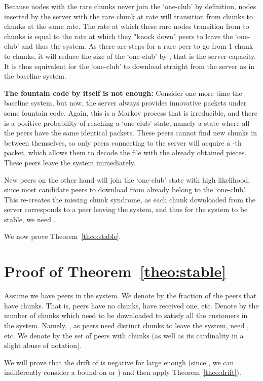 \documentclass[11pt,conference]{IEEEtran}
\begin{document}
Because nodes with the rare chunks never join the `one-club' by definition, nodes inserted by the server with the rare chunk at rate  will transition from  chunks to  chunks at the same rate. The rate at which these rare nodes transition from  to  chunks is equal to the rate at which they "knock down" peers to leave the `one-club' and thus the system. As there are  steps for a rare peer to go from 1 chunk to  chunks, it will reduce the size of the `one-club' by , that is the server capacity. It is thus equivalent for the `one-club' to download straight from the server as in the baseline system.

{\bf The fountain code by itself is not enough:} Consider one more time the baseline system, but now, the server always provides innovative packets under some fountain code. Again, this is a Markov process that is irreducible, and there is a positive probability of reaching a `one-club' state, namely a state where all the peers have the same identical  packets. These peers cannot find new chunks in between themselves, so only peers connecting to the server will acquire a -th packet, which allows them to decode the file with the already obtained  pieces. These peers leave the system immediately.

New peers on the other hand will join the `one-club' state with high likelihood, since most candidate peers to download from already belong to the `one-club'. This re-creates the missing chunk syndrome, as each chunk downloaded from the server corresponds to a peer leaving the system, and thus for the system to be stable, we need .

We now prove Theorem~\ref{theo:stable}.

\section{Proof of Theorem~\ref{theo:stable}}
\label{sec:proof}

Assume we have  peers in the system. We denote by  the fraction of the  peers that have  chunks. That is,  peers have no chunks,  have received one, etc. Denote by  the number of chunks which need to be downloaded to satisfy all the customers in the system. Namely, , as  peers need  distinct chunks to leave the system,  need , etc. We denote by  the set of peers with  chunks (as well as its cardinality in a slight abuse of notation).

We will prove that the drift of  is negative for  large enough (since , we can indifferently consider a bound on  or ) and then apply Theorem~\ref{theo:drift}).
\end{document}
